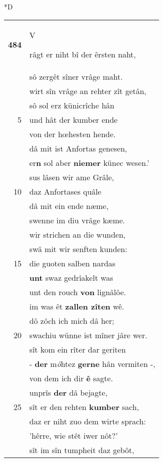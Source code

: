 \documentclass[8pt,a4paper,notitlepage]{article}
\begin{document}
\begin{table}[ht]
\begin{minipage}[t]{0.5\linewidth}
\small
\begin{center}*D
\end{center}
\begin{tabular}{rl}
\textbf{484} & \begin{large}V\end{large}râgt er niht bî der êrsten naht,\\ 
 & sô zergêt sîner vrâge maht.\\ 
 & wirt sîn vrâge an rehter zît getân,\\ 
 & sô sol erz künicrîche hân\\ 
5 & und hât der kumber ende\\ 
 & von der hœhesten hende.\\ 
 & dâ mit ist Anfortas genesen,\\ 
 & er\textbf{n} sol aber \textbf{niemer} künec wesen.'\\ 
 & sus lâsen wir ame Grâle,\\ 
10 & daz Anfortases quâle\\ 
 & dâ mit ein ende næme,\\ 
 & swenne im diu vrâge kæme.\\ 
 & wir strichen an die wunden,\\ 
 & swâ mit wir senften kunden:\\ 
15 & die guoten salben nardas\\ 
 & \textbf{unt} swaz gedrîakelt was\\ 
 & unt den rouch \textbf{von} lignâlôe.\\ 
 & im was êt \textbf{zallen zîten} wê.\\ 
 & dô zôch ich mich dâ her;\\ 
20 & swachiu wünne ist mîner jâre wer.\\ 
 & sît kom ein rîter dar geriten\\ 
 & - \textbf{der} m\textit{ö}htez \textbf{gerne} hân vermiten -,\\ 
 & von dem ich dir \textbf{ê} sagte.\\ 
 & unprîs \textbf{der} dâ bejagte,\\ 
25 & sît er den rehten \textbf{kumber} sach,\\ 
 & daz er niht zuo dem wirte sprach:\\ 
 & 'hêrre, wie stêt iwer nôt?'\\ 
 & sît im sîn tumpheit daz gebôt,\\ 

\end{tabular}
\end{minipage}
\end{table}
\end{document}
